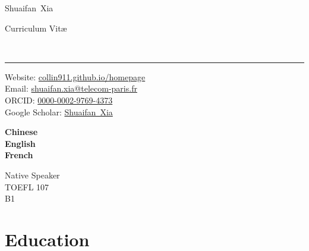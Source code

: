 \documentclass[9pt,a4paper]{article}
\makeatletter
\newcommand{\Title}{Curriculum Vit\ae}
\newcommand{\FirstName}{Shuaifan}
\newcommand{\LastName}{Xia}
\newcommand{\MyName}{\FirstName\ \LastName}
\newcommand{\Email}{shuaifan.xia@telecom-paris.fr}
\newcommand{\PersonalWebsite}{collin911.github.io/homepage}
\newcommand{\ORCID}{0000-0002-9769-4373}
\newcommand{\Website}[1]{\href{https://#1}{#1}}
\makeatother
\begin{document}
\begin{minipage}[t]{0.5\textwidth}
  {\fontsize{20pt}{0}\selectfont\MyName}
\end{minipage}
\begin{minipage}[t]{0.5\textwidth}
  \begin{flushright}
    \Title{}
  \end{flushright}
\end{minipage}
\\[-0.1cm]
\textcolor{lightgray}{\rule{\textwidth}{3pt}}
\begin{minipage}[t]{0.75\textwidth}
  Website: \Website{\PersonalWebsite}
  \\
  Email: \href{mailto:\Email}{\Email}
  \\
  ORCID: \href{https://orcid.org/\ORCID}{\ORCID}
  \\
  Google Scholar: \href{https://scholar.google.com/citations?user=x4Y8uCAAAAAJ}{\MyName}
\end{minipage}
\begin{minipage}[t]{0.07\textwidth}
    \textbf{Chinese} 
    \\
    \textbf{English} 
    \\
    \textbf{French} 
    \\
\end{minipage}
\begin{minipage}[t]{0.18\textwidth}
  \begin{flushright}
    Native Speaker
    \\
    TOEFL 107
    \\
    B1
    \\
  \end{flushright}
\end{minipage}


\section{Education}
\end{document}

